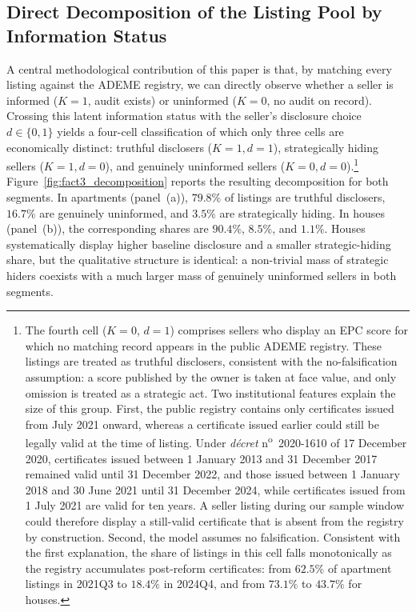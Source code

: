 \documentclass[10pt,letterpaper]{bp-template-concise}
\begin{document}
\subsection{Direct Decomposition of the Listing Pool by Information Status}
\label{ss:fact3}

A central methodological contribution of this paper is that, by matching every listing against the ADEME registry, we can directly observe whether a seller is informed ($K=1$, audit exists) or uninformed ($K=0$, no audit on record). Crossing this latent information status with the seller's disclosure choice $d \in \{0,1\}$ yields a four-cell classification of which only three cells are economically distinct: truthful disclosers ($K=1, d=1$), strategically hiding sellers ($K=1, d=0$), and genuinely uninformed sellers ($K=0, d=0$).\footnote{The fourth cell ($K=0$, $d=1$) comprises sellers who display an EPC score for which no matching record appears in the public ADEME registry. These listings are treated as truthful disclosers, consistent with the no-falsification assumption: a score published by the owner is taken at face value, and only omission is treated as a strategic act. Two institutional features explain the size of this group. First, the public registry contains only certificates issued from July 2021 onward, whereas a certificate issued earlier could still be legally valid at the time of listing. Under \emph{d\'ecret} n\textsuperscript{o}~2020-1610 of 17 December 2020, certificates issued between 1 January 2013 and 31 December 2017 remained valid until 31 December 2022, and those issued between 1 January 2018 and 30 June 2021 until 31 December 2024, while certificates issued from 1 July 2021 are valid for ten years. A seller listing during our sample window could therefore display a still-valid certificate that is absent from the registry by construction. Second, the model assumes no falsification. Consistent with the first explanation, the share of listings in this cell falls monotonically as the registry accumulates post-reform certificates: from $62.5\%$ of apartment listings in 2021Q3 to $18.4\%$ in 2024Q4, and from $73.1\%$ to $43.7\%$ for houses.} Figure~\ref{fig:fact3_decomposition} reports the resulting decomposition for both segments. In apartments (panel~(a)), $79.8\%$ of listings are truthful disclosers, $16.7\%$ are genuinely uninformed, and $3.5\%$ are strategically hiding. In houses (panel~(b)), the corresponding shares are $90.4\%$, $8.5\%$, and $1.1\%$. Houses systematically display higher baseline disclosure and a smaller strategic-hiding share, but the qualitative structure is identical: a non-trivial mass of strategic hiders coexists with a much larger mass of genuinely uninformed sellers in both segments.
\end{document}
